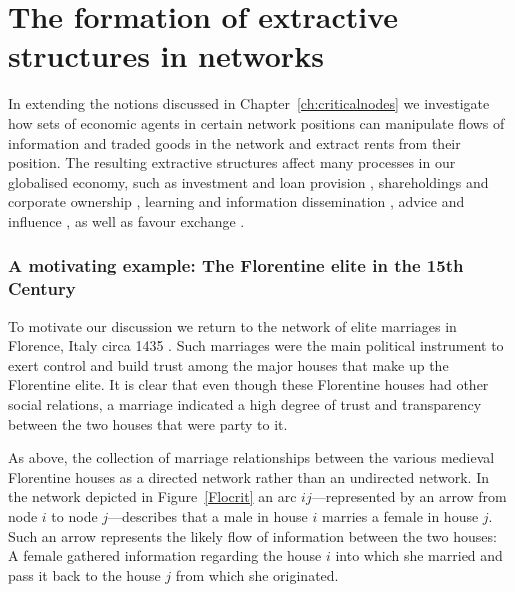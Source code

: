 \chapter{The formation of extractive structures in networks}
\label{ch:blocks}

In extending the notions discussed in Chapter~\ref{ch:criticalnodes} we investigate how sets of economic agents in certain network positions can manipulate flows of information and traded goods in the network and extract rents from their position. The resulting extractive structures affect many processes in our globalised economy, such as investment and loan provision \citep{Gai2010, ElliotGolubJackson2014}, shareholdings and corporate ownership \citep{Vitali2011}, learning and information dissemination \citep{GolubJackson2010}, advice and influence \citep{Krackhardt1987}, as well as favour exchange \citep{Jackson2012}.

\subsection{A motivating example: The Florentine elite in the 15th Century}

To motivate our discussion we return to the network of elite marriages in Florence, Italy circa 1435 \citep{Kent1978,Padgett1993}. Such marriages were the main political instrument to exert control and build trust among the major houses that make up the Florentine elite. It is clear that even though these Florentine houses had other social relations, a marriage indicated a high degree of trust and transparency between the two houses that were party to it.

As above, the collection of marriage relationships between the various medieval Florentine houses as a directed network rather than an undirected network. In the network depicted in Figure~\ref{Flocrit} an arc $ij$---represented by an arrow from node $i$ to node $j$---describes that a male in house $i$ marries a female in house $j$. Such an arrow represents the likely flow of information between the two houses: A female gathered information regarding the house $i$ into which she married and pass it back to the house $j$ from which she originated.

